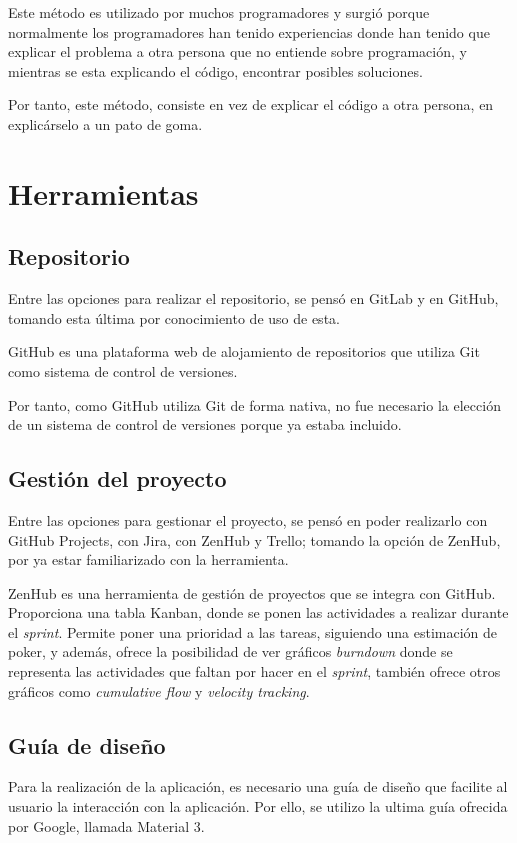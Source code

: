     Este método es utilizado por muchos programadores y surgió porque normalmente los programadores han tenido experiencias donde han tenido que explicar el problema a otra persona que no entiende sobre programación, y mientras se esta explicando el código, encontrar posibles soluciones. 
    
    Por tanto, este método, consiste en vez de explicar el código a otra persona, en explicárselo a un pato de goma.

\section{Herramientas}

    \subsection{Repositorio}
        Entre las opciones para realizar el repositorio, se pensó en GitLab y en GitHub, tomando esta última por conocimiento de uso de esta.

        GitHub es una plataforma web de alojamiento de repositorios que utiliza Git como sistema de control de versiones.

        Por tanto, como GitHub utiliza Git de forma nativa, no fue necesario la elección de un sistema de control de versiones porque ya estaba incluido.
    \subsection{Gestión del proyecto}
        Entre las opciones para gestionar el proyecto, se pensó en poder realizarlo con GitHub Projects, con Jira, con ZenHub y Trello; tomando la opción de ZenHub, por ya estar familiarizado con la herramienta.

        ZenHub es una herramienta de gestión de proyectos que se integra con GitHub. Proporciona una tabla Kanban, donde se ponen las actividades a realizar durante el \textit{sprint}. Permite poner una prioridad a las tareas, siguiendo una estimación de poker, y además, ofrece la posibilidad de ver gráficos \textit{burndown} donde se representa las actividades que faltan por hacer en el \textit{sprint}, también ofrece otros gráficos como \textit{cumulative flow} y \textit{velocity tracking}.

    \subsection{Guía de diseño}
        Para la realización de la aplicación, es necesario una guía de diseño que facilite al usuario la interacción con la aplicación. Por ello, se utilizo la ultima guía ofrecida por Google, llamada Material 3.


